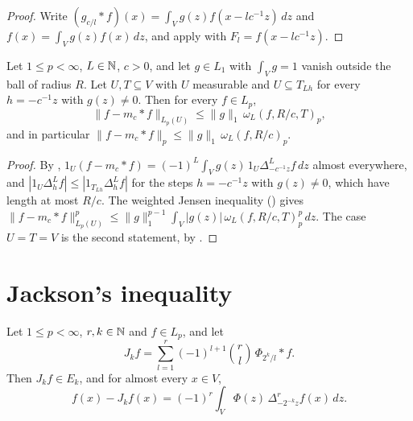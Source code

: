 \begin{proof}
\leanok
Write $(g_{c/l} * f)(x) = \int_V g(z) f(x - l c^{-1} z) \, dz$ and $f(x) = \int_V g(z) f(x) \, dz$,
and apply  with $F_l = f(x - l c^{-1} z)$.
\end{proof}

\begin{theorem}
\label{thm:moment-approx}
\leanok
{}
Let $1 \leq p < \infty$, $L \in \mathbb{N}$, $c > 0$, and let $g \in L_1$ with $\int_V g = 1$ vanish
outside the ball of radius $R$. Let $U, T \subseteq V$ with $U$ measurable and $U \subseteq T_{Lh}$
for every $h = -c^{-1} z$ with $g(z) \neq 0$. Then for every $f \in L_p$,
\[
  \|f - m_c * f\|_{L_p(U)} \leq \|g\|_1 \, \omega_L(f, R/c, T)_p ,
\]
and in particular $\|f - m_c * f\|_p \leq \|g\|_1 \, \omega_L(f, R/c)_p$.
\end{theorem}

\begin{proof}
\leanok
By ,
$1_U (f - m_c * f) = (-1)^L \int_V g(z) \, 1_U \Delta^L_{-c^{-1} z} f \, dz$ almost everywhere,
and $|1_U \Delta^L_h f| \leq |1_{T_{Lh}} \Delta^L_h f|$ for the steps $h = -c^{-1} z$ with
$g(z) \neq 0$, which have length at most $R/c$. The weighted Jensen inequality
() gives
$\|f - m_c * f\|_{L_p(U)}^p \leq \|g\|_1^{p-1} \int_V |g(z)| \, \omega_L(f, R/c, T)_p^p \, dz$.
The case $U = T = V$ is the second statement, by .
\end{proof}

\section{Jackson's inequality}

\begin{lemma}
\label{lem:jackson-approx}
\leanok
{}
Let $1 \leq p < \infty$, $r, k \in \mathbb{N}$ and $f \in L_p$, and let
\[
  J_k f = \sum_{l=1}^r (-1)^{l+1} \binom{r}{l} \, \Phi_{2^k/l} * f .
\]
Then $J_k f \in E_k$, and for almost every $x \in V$,
\[
  f(x) - J_k f(x) = (-1)^r \int_V \Phi(z) \, \Delta^r_{-2^{-k} z} f(x) \, dz .
\]
\end{lemma}


